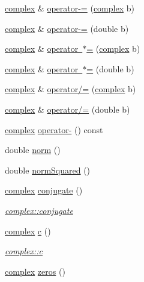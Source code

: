 \begin{DoxyCompactItemize}
\item 
\mbox{\hyperlink{classcomplex}{complex}} \& \mbox{\hyperlink{classcomplex_af797416b6b4b45c2bb54958fcd076a0e}{operator-\/=}} (\mbox{\hyperlink{classcomplex}{complex}} b)
\item 
\mbox{\hyperlink{classcomplex}{complex}} \& \mbox{\hyperlink{classcomplex_a91a1788c52422330b8785ac3dc87972f}{operator-\/=}} (double b)
\item 
\mbox{\hyperlink{classcomplex}{complex}} \& \mbox{\hyperlink{classcomplex_a1916e5817cf8faf91347120309e99e59}{operator $\ast$=}} (\mbox{\hyperlink{classcomplex}{complex}} b)
\item 
\mbox{\hyperlink{classcomplex}{complex}} \& \mbox{\hyperlink{classcomplex_addc9b5f5da847cd8c3c0e72401ab6513}{operator $\ast$=}} (double b)
\item 
\mbox{\hyperlink{classcomplex}{complex}} \& \mbox{\hyperlink{classcomplex_a2f33210a2ac9f91ad3f1f94958c52ee9}{operator/=}} (\mbox{\hyperlink{classcomplex}{complex}} b)
\item 
\mbox{\hyperlink{classcomplex}{complex}} \& \mbox{\hyperlink{classcomplex_ae519ff68a81b3c9944a3e3ec60bbe80f}{operator/=}} (double b)
\item 
\mbox{\hyperlink{classcomplex}{complex}} \mbox{\hyperlink{classcomplex_a969988c8e6c2a3af52c64e531471f6c0}{operator-\/}} () const
\item 
double \mbox{\hyperlink{classcomplex_a81dd00af9a4f56a86bd242b31cb1f8a4}{norm}} ()
\item 
double \mbox{\hyperlink{classcomplex_a5f69e50235222338ccd0e985de6b80d1}{norm\+Squared}} ()
\item 
\mbox{\hyperlink{classcomplex}{complex}} \mbox{\hyperlink{classcomplex_af21a3dae4577a3aab8e1105a1b919b81}{conjugate}} ()
\begin{DoxyCompactList}\small\item\em \mbox{\hyperlink{classcomplex_af21a3dae4577a3aab8e1105a1b919b81}{complex\+::conjugate}} \end{DoxyCompactList}\item 
\mbox{\hyperlink{classcomplex}{complex}} \mbox{\hyperlink{classcomplex_a4741546b5617d11e87ee7831067c84c5}{c}} ()
\begin{DoxyCompactList}\small\item\em \mbox{\hyperlink{classcomplex_a4741546b5617d11e87ee7831067c84c5}{complex\+::c}} \end{DoxyCompactList}\item 
\mbox{\hyperlink{classcomplex}{complex}} \mbox{\hyperlink{classcomplex_ab1009ede7230f86df1a13f9c5c258ac7}{zeros}} ()
\end{DoxyCompactItemize}
